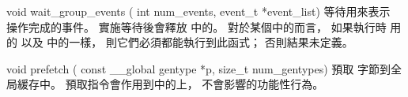void wait_group_events (
	int num_events,
	event_t *event_list)
\stopbuffer
{}
等待用來表示  操作完成的事件。
實施等待後會釋放  中的。
對於某個中的而言，
如果執行時
用的  以及  中的一樣，
則它們必須都能執行到此函式；
否則結果未定義。
\stopbuffer

void prefetch (
	const __global gentype *p,
	size_t num_gentypes)
\stopbuffer
{}
預取  字節到全局緩存中。
預取指令會作用到中的上，
不會影響的功能性行為。
\stopbuffer

